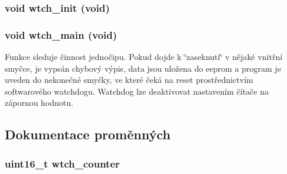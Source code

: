 \subsubsection[{wtch\_\-init}]{\setlength{\rightskip}{0pt plus 5cm}void wtch\_\-init (void)}\label{watchdog_8h_acbdab9cad3f2f8b16ff00ad69af20145}
\subsubsection[{wtch\_\-main}]{\setlength{\rightskip}{0pt plus 5cm}void wtch\_\-main (void)}\label{watchdog_8h_ab51323d0a8ec8c832d7be1ab44ffbc3b}
Funkce sleduje činnost jednočipu. Pokud dojde k \char`\"{}zaseknutí\char`\"{} v nějaké vnitřní smyčce, je vypsán chybový výpis, data jsou uložena do eeprom a program je uveden do nekonečné smyčky, ve které čeká na reset prostřednictvím softwarového watchdogu. Watchdog lze deaktivovat nastavením čítače na zápornou hodnotu. 

\subsection{Dokumentace proměnných}
\subsubsection[{wtch\_\-counter}]{\setlength{\rightskip}{0pt plus 5cm}uint16\_\-t {\bf wtch\_\-counter}}\label{watchdog_8h_a65366c710bff228f8a652480055368bc}
